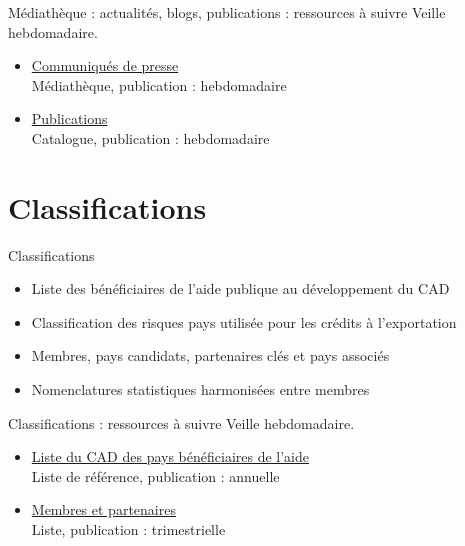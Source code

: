 \documentclass[aspectratio=169,11pt]{beamer}
\begin{document}
\begin{frame}{Médiathèque : actualités, blogs, publications : ressources à suivre}
\small
Veille hebdomadaire.
\begin{itemize}
\item \href{https://www.oecd.org/en/about/news/press-releases.html}{Communiqués de presse}\\{\footnotesize Médiathèque, publication : hebdomadaire}
\item \href{https://www.oecd.org/en/publications.html}{Publications}\\{\footnotesize Catalogue, publication : hebdomadaire}
\end{itemize}
\end{frame}

\section{Classifications}
\begin{frame}{Classifications}
\begin{itemize}
\item Liste des bénéficiaires de l'aide publique au développement du CAD
\item Classification des risques pays utilisée pour les crédits à l'exportation
\item Membres, pays candidats, partenaires clés et pays associés
\item Nomenclatures statistiques harmonisées entre membres
\end{itemize}
\end{frame}

\begin{frame}{Classifications : ressources à suivre}
\small
Veille hebdomadaire.
\begin{itemize}
\item \href{https://www.oecd.org/en/topics/sub-issues/oda-eligibility-and-conditions/dac-list-of-oda-recipients.html}{Liste du CAD des pays bénéficiaires de l'aide}\\{\footnotesize Liste de référence, publication : annuelle}
\item \href{https://www.oecd.org/en/about/members-partners.html}{Membres et partenaires}\\{\footnotesize Liste, publication : trimestrielle}
\end{itemize}
\end{frame}
\end{document}
